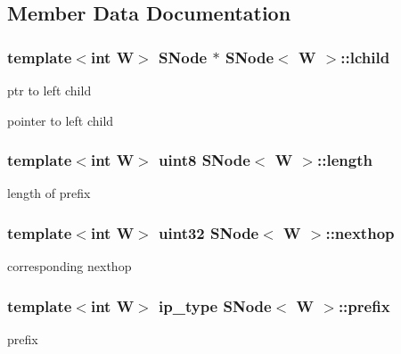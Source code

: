 \subsection{Member Data Documentation}
\hypertarget{structSNode_a8b3c44ff242d9eca3b0e2503b857b133}{
\subsubsection[{lchild}]{\setlength{\rightskip}{0pt plus 5cm}template$<$int W$>$ {\bf S\-Node} $\ast$ {\bf S\-Node}$<$ {\bf W} $>$\-::lchild}}\label{structSNode_a8b3c44ff242d9eca3b0e2503b857b133}


ptr to left child 

pointer to left child \hypertarget{structSNode_a26a41fee7f633ec3c1cde1b53d3dd991}{
\subsubsection[{length}]{\setlength{\rightskip}{0pt plus 5cm}template$<$int W$>$ {\bf uint8} {\bf S\-Node}$<$ {\bf W} $>$\-::length}}\label{structSNode_a26a41fee7f633ec3c1cde1b53d3dd991}


length of prefix 

\hypertarget{structSNode_a37372530de83477ae96a73ba352ec7ef}{
\subsubsection[{nexthop}]{\setlength{\rightskip}{0pt plus 5cm}template$<$int W$>$ {\bf uint32} {\bf S\-Node}$<$ {\bf W} $>$\-::nexthop}}\label{structSNode_a37372530de83477ae96a73ba352ec7ef}


corresponding nexthop 

\hypertarget{structSNode_a3fa37cdc5c85a39d13b1c008d80004b2}{
\subsubsection[{prefix}]{\setlength{\rightskip}{0pt plus 5cm}template$<$int W$>$ {\bf ip\-\_\-type} {\bf S\-Node}$<$ {\bf W} $>$\-::{\bf prefix}}}\label{structSNode_a3fa37cdc5c85a39d13b1c008d80004b2}


prefix 

